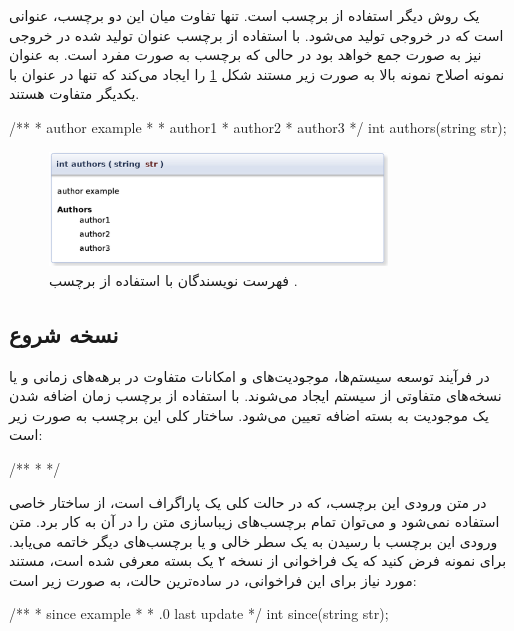 یک روش دیگر استفاده از برچسب  است.
تنها تفاوت میان این دو برچسب، عنوانی است که در خروجی تولید می‌شود.
با استفاده از برچسب  عنوان تولید شده در خروجی نیز به صورت جمع خواهد
بود در حالی که برچسب  به صورت مفرد است.
به عنوان نمونه اصلاح نمونه بالا به صورت زیر مستند شکل
\ref{write/document-the-code/developer-info/author-multi2} را ایجاد می‌کند که
تنها در عنوان با یکدیگر متفاوت هستند.
\begin{C++}
/**
 * \brief author example
 *
 * \authors author1
 * \authors author2
 * \authors author3
 */
int authors(string str);
\end{C++}
\begin{figure}
	\centering
	\includegraphics[width=0.8\textwidth]{image/write/document-the-code/developer-info/author-multi2}
	\caption[فهرست نویسندگان]{
		فهرست نویسندگان با استفاده از برچسب .
	}
	\label{write/document-the-code/developer-info/author-multi2}
\end{figure}


\subsection{نسخه شروع}

در فرآیند توسعه سیستم‌ها، موجودیت‌های و امکانات متفاوت در برهه‌های زمانی و یا
نسخه‌های متفاوتی از سیستم ایجاد می‌شوند.
با استفاده از برچسب  زمان اضافه شدن یک موجودیت به بسته اضافه تعیین می‌شود.
ساختار کلی این برچسب به صورت زیر است:
\begin{C++}
/**
 * 
 */
\end{C++}

در متن ورودی این برچسب، که در حالت کلی یک پاراگراف است، از ساختار خاصی استفاده نمی‌شود
و می‌توان تمام برچسب‌های زیباسازی متن را در آن به کار برد.
متن ورودی این برچسب با رسیدن به یک سطر خالی و یا برچسب‌های دیگر خاتمه می‌یابد.
برای نمونه فرض کنید که یک فراخوانی از نسخه ۲ یک بسته معرفی شده است، مستند مورد نیاز برای 
این فراخوانی، در ساده‌ترین حالت، به صورت زیر است:
\begin{C++}
/**
 * \brief since example
 *
 * .0 last update
 */
int since(string str);
\end{C++}

